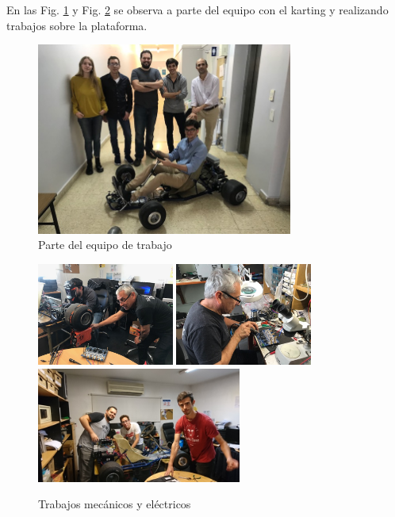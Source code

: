 \documentclass[a4paper]{article}
\begin{document}
En las Fig. \ref{fig:equipo1} y Fig. \ref{fig:equipo2} se observa a parte del equipo con el karting y realizando trabajos sobre la plataforma.
%
\begin{figure}[h]
    \centering
    \includegraphics[width=0.75\textwidth]{figs/equipo1.jpg}
    \caption{Parte del equipo de trabajo}
    \label{fig:equipo1}
\end{figure}
%
\begin{figure}[h]
    \centering
    \includegraphics[width=0.4\textwidth]{figs/equipo2.jpg}
    \includegraphics[width=0.4\textwidth]{figs/equipo3.jpg}
    \includegraphics[width=0.6\textwidth]{figs/equipo4.jpg}
    \caption{Trabajos mecánicos y eléctricos}
    \label{fig:equipo2}
\end{figure}
\end{document}
